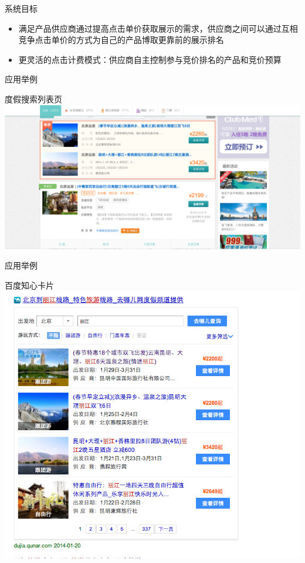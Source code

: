 \documentclass{beamer}
\begin{document}
\begin{CJK}{UTF8}{gbsn}
\begin{frame}{系统目标}
  \begin{itemize}
  \item {
    满足产品供应商通过提高点击单价获取展示的需求，供应商之间可以通过互相竞争点击单价的方式为自己的产品博取更靠前的展示排名
  }
  \item {
    更灵活的点击计费模式：供应商自主控制参与竞价排名的产品和竞价预算
  }
  \end{itemize}
\end{frame}

\begin{frame}{应用举例}
  \begin{block}{度假搜索列表页}
    \includegraphics[scale=0.22]{./imgs/overview-qunar}
  \end{block}
\end{frame}

\begin{frame}{应用举例}
  \begin{block}{百度知心卡片}
    \includegraphics[scale=0.3]{./imgs/overview-baidu}
  \end{block}
\end{frame}


\end{CJK}
\end{document}
